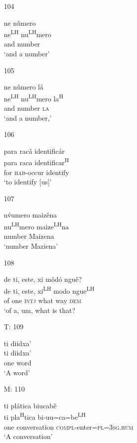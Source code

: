 \begin{itemize}
\item[104]
 
\glll   ne n\v{u}mero \\
ne\textsuperscript{LH} nu\textsuperscript{LH}mero \\
 and number \\
\glt `and a number'
 


\item[105]
 
\glll   ne n\v{u}mero l\'{a} \\
ne\textsuperscript{LH} nu\textsuperscript{LH}mero la\textsuperscript{H} \\
and number \textsc{la} \\
\glt `and a number,' 
 

\item[106]
 
\glll   para rac\v{a} identific\'{a}r \\
para raca identificar\textsuperscript{H} \\
for \textsc{hab}-occur identify \\
\glt `to identify [us]'
 


\item[107]
 
\glll   n\'v{u}mero maiz\v{e}na \\
 nu\textsuperscript{LH}mero maize\textsuperscript{LH}na \\
 number Maizena \\
\glt `number Maziena'
 

\item[108]
 
\glll  de ti, este, xi m\v{o}d\'{o} ngu\v{e}? \\
de ti, este, xi\textsuperscript{LH} modo ngue\textsuperscript{LH} \\
 of one \textsc{intj} what way \textsc{dem} \\
\glt `of a, um, what is that?
 

\item[T: 109]
 
\glll   ti diidxa' \\
 ti diidxa' \\ 
 one word \\
\glt `A word'
 


\item[M: 110]
 
\glll   ti pl\'{a}tica biucab\v{e} \\
ti pla\textsuperscript{H}tica bi-uu=ca=be\textsuperscript{LH} \\
one conversation \textsc{compl}-enter=\textsc{pl}=\textsc{3sg.hum} \\
\glt `A conversation'
 



\end{itemize}
